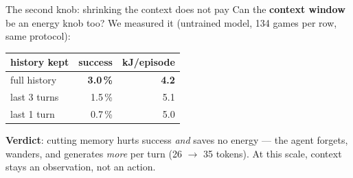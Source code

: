 \documentclass[10pt,aspectratio=169]{beamer}
\begin{document}
\begin{frame}{The second knob: shrinking the context does not pay}
\small
Can the \textbf{context window} be an energy knob too? We measured it
(untrained model, 134 games per row, same protocol):
\vspace{0.4em}
\begin{center}\normalsize
\begin{tabular}{@{}lrr@{}}
\toprule
history kept & success & kJ/episode \\
\midrule
full history & \textbf{3.0\,\%} & \textbf{4.2} \\
last 3 turns & 1.5\,\% & 5.1 \\
last 1 turn & 0.7\,\% & 5.0 \\
\bottomrule
\end{tabular}
\end{center}
\vspace{0.4em}
\textbf{Verdict}: cutting memory hurts success \emph{and} saves no energy --- the agent forgets,
wanders, and generates \emph{more} per turn (26 $\rightarrow$ 35 tokens). At this scale, context
stays an observation, not an action.
\end{frame}
\end{document}
